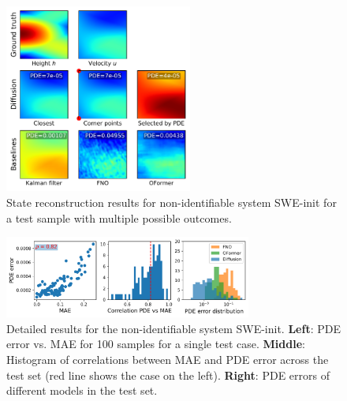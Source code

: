 \documentclass{article}
\begin{document}
\begin{figure}[t]
\newcommand{\myheight}{62mm}
\centering
\includegraphics[height=\myheight,trim={2mm 3mm 2mm 2mm},clip]{img/predict/predictions_all_61_pde.pdf}

\vskip -3mm
\caption{State reconstruction results for non-identifiable system SWE-init for a test sample with multiple possible outcomes. }
\label{f:swe_predict}
\end{figure}


\begin{figure}[t]
\newcommand{\myheight}{27mm}
\centering
\vskip -2mm
\includegraphics[height=\myheight,trim={2mm 3mm 2mm 2mm},clip]{img/mae_pde_scatter_hist.pdf}

\vskip -2mm
\caption{Detailed results for the non-identifiable system SWE-init. \textbf{Left}: PDE error vs. MAE for 100 samples for a single test case. \textbf{Middle}: Histogram of correlations between MAE and PDE error across the test set (red line shows the case on the left). \textbf{Right}: PDE errors of different models in the test set. }
\label{f:swe_mae_pde_correlation}
\end{figure}
\end{document}
